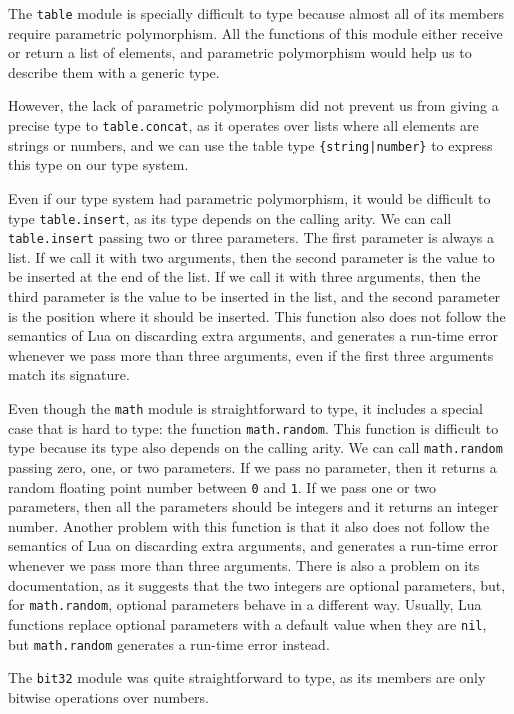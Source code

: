 The \texttt{table} module is specially difficult to type because
almost all of its members require parametric polymorphism.
All the functions of this module either receive or return a list
of elements, and parametric polymorphism would help us to describe
them with a generic type.

However, the lack of parametric polymorphism did not prevent us from
giving a precise type to \texttt{table.concat}, as it operates over lists
where all elements are strings or numbers, and we can use the table type
\texttt{\{string|number\}} to express this type on our type system.

Even if our type system had parametric polymorphism, it would
be difficult to type \texttt{table.insert}, as its type depends on
the calling arity.
We can call \texttt{table.insert} passing two or three parameters.
The first parameter is always a list.
If we call it with two arguments, then the second parameter
is the value to be inserted at the end of the list.
If we call it with three arguments, then the third parameter
is the value to be inserted in the list, and the second
parameter is the position where it should be inserted.
This function also does not follow the semantics of Lua on
discarding extra arguments, and generates a run-time error whenever
we pass more than three arguments, even if the first three arguments
match its signature.

Even though the \texttt{math} module is straightforward to type,
it includes a special case that is hard to type: the function \texttt{math.random}.
This function is difficult to type because its type also depends
on the calling arity.
We can call \texttt{math.random} passing zero, one, or two parameters.
If we pass no parameter, then it returns a random floating point
number between \texttt{0} and \texttt{1}.
If we pass one or two parameters, then all the parameters should be
integers and it returns an integer number.
Another problem with this function is that it also does not follow
the semantics of Lua on discarding extra arguments, and generates
a run-time error whenever we pass more than three arguments.
There is also a problem on its documentation, as it suggests that
the two integers are optional parameters, but, for \texttt{math.random},
optional parameters behave in a different way.
Usually, Lua functions replace optional parameters with a default value
when they are \texttt{nil}, but \texttt{math.random} generates a run-time
error instead.

The \texttt{bit32} module was quite straightforward to type,
as its members are only bitwise operations over numbers.

